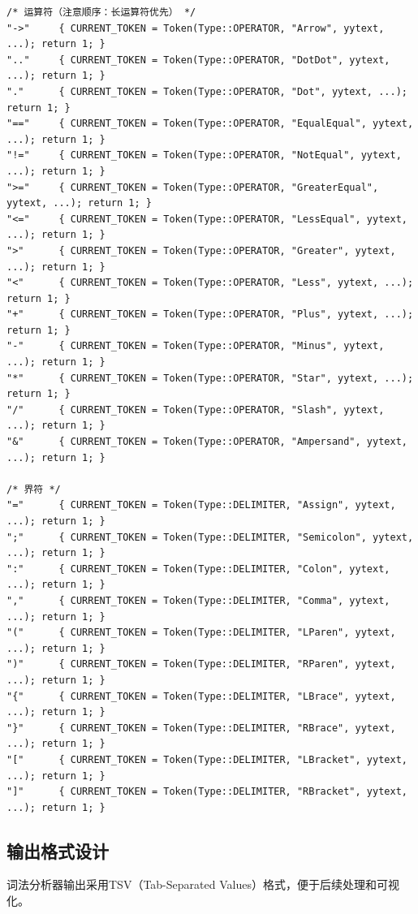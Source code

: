 \documentclass[12pt,a4paper]{ctexart}
\begin{document}
\begin{lstlisting}[language=Flex, caption={运算符与界符识别规则}]
/* 运算符（注意顺序：长运算符优先） */
"->"     { CURRENT_TOKEN = Token(Type::OPERATOR, "Arrow", yytext, ...); return 1; }
".."     { CURRENT_TOKEN = Token(Type::OPERATOR, "DotDot", yytext, ...); return 1; }
"."      { CURRENT_TOKEN = Token(Type::OPERATOR, "Dot", yytext, ...); return 1; }
"=="     { CURRENT_TOKEN = Token(Type::OPERATOR, "EqualEqual", yytext, ...); return 1; }
"!="     { CURRENT_TOKEN = Token(Type::OPERATOR, "NotEqual", yytext, ...); return 1; }
">="     { CURRENT_TOKEN = Token(Type::OPERATOR, "GreaterEqual", yytext, ...); return 1; }
"<="     { CURRENT_TOKEN = Token(Type::OPERATOR, "LessEqual", yytext, ...); return 1; }
">"      { CURRENT_TOKEN = Token(Type::OPERATOR, "Greater", yytext, ...); return 1; }
"<"      { CURRENT_TOKEN = Token(Type::OPERATOR, "Less", yytext, ...); return 1; }
"+"      { CURRENT_TOKEN = Token(Type::OPERATOR, "Plus", yytext, ...); return 1; }
"-"      { CURRENT_TOKEN = Token(Type::OPERATOR, "Minus", yytext, ...); return 1; }
"*"      { CURRENT_TOKEN = Token(Type::OPERATOR, "Star", yytext, ...); return 1; }
"/"      { CURRENT_TOKEN = Token(Type::OPERATOR, "Slash", yytext, ...); return 1; }
"&"      { CURRENT_TOKEN = Token(Type::OPERATOR, "Ampersand", yytext, ...); return 1; }

/* 界符 */
"="      { CURRENT_TOKEN = Token(Type::DELIMITER, "Assign", yytext, ...); return 1; }
";"      { CURRENT_TOKEN = Token(Type::DELIMITER, "Semicolon", yytext, ...); return 1; }
":"      { CURRENT_TOKEN = Token(Type::DELIMITER, "Colon", yytext, ...); return 1; }
","      { CURRENT_TOKEN = Token(Type::DELIMITER, "Comma", yytext, ...); return 1; }
"("      { CURRENT_TOKEN = Token(Type::DELIMITER, "LParen", yytext, ...); return 1; }
")"      { CURRENT_TOKEN = Token(Type::DELIMITER, "RParen", yytext, ...); return 1; }
"{"      { CURRENT_TOKEN = Token(Type::DELIMITER, "LBrace", yytext, ...); return 1; }
"}"      { CURRENT_TOKEN = Token(Type::DELIMITER, "RBrace", yytext, ...); return 1; }
"["      { CURRENT_TOKEN = Token(Type::DELIMITER, "LBracket", yytext, ...); return 1; }
"]"      { CURRENT_TOKEN = Token(Type::DELIMITER, "RBracket", yytext, ...); return 1; }
\end{lstlisting}

\subsection{输出格式设计}

词法分析器输出采用TSV（Tab-Separated Values）格式，便于后续处理和可视化。
\end{document}
